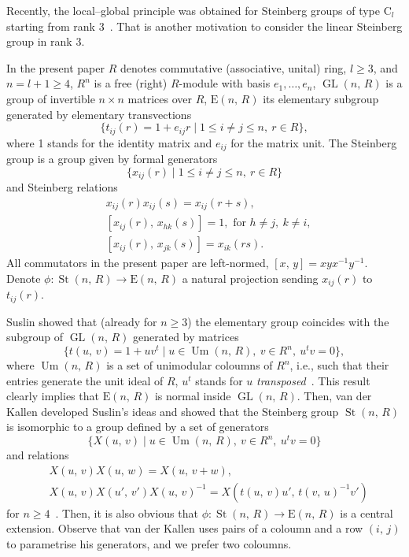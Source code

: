 \documentclass[11pt]{amsart}
\theoremstyle{plain} \declaretheorem[name=Theorem, Refname={Theorem,Theorems}]{tm} \Crefname{tm}{Theorem}{Theorems}
\numberwithin{equation}{section}
\theoremstyle{definition} \newtheorem{df}[lm]{Definition} \Crefname{df}{Definition}{Definitions}
\theoremstyle{remark} \newtheorem{rk}[lm]{Remark} \Crefname{rk}{Remark}{Remarks}
\newcommand{\E}{{\mathrm{E}}}
\newcommand{\Um}{\mathop{\mathrm{Um}}\nolimits}
\newcommand{\St}{\mathop{\mathrm{St}}\nolimits}
\newcommand{\GL}{\mathop{\mathrm{GL}}\nolimits}
\newcommand{\inv}{^{-1}}
\begin{document}
Recently, the local--global principle was obtained for Steinberg groups of type $\mathrm C_l$ starting from rank 3~\cite{Lav2}. 
That is another motivation to consider the linear Steinberg group in rank 3.

In the present paper $R$ denotes commutative (associative, unital) ring, $l\geq3$, and $n=l+1\geq4$, $R^n$ is a free (right) $R$-module with basis $e_1,\ldots,e_n$, 
$\GL(n,\,R)$ is a group of invertible $n\times n$ matrices over $R$, $\E(n,\,R)$ its elementary subgroup generated by elementary transvections 
$$\{t_{ij}(r)=1+e_{ij}r\mid1\leq i\neq j\leq n,\ r\in R\},$$
where 1 stands for the identity matrix and $e_{ij}$ for the matrix unit. The Steinberg group is a group given by formal generators
$$\{x_{ij}(r)\mid1\leq i\neq j\leq n,\ r\in R\}$$
and Steinberg relations
\setcounter{equation}{0}
\renewcommand{\theequation}{S\arabic{equation}}
\begin{align}
&x_{ij}(r)x_{ij}(s)=x_{ij}(r+s),\\
&[x_{ij}(r),\,x_{hk}(s)]=1,\text{ for }h\neq j,\ k\neq i,\\
&[x_{ij}(r),\,x_{jk}(s)]=x_{ik}(rs).
\end{align}
All commutators in the present paper are left-normed, $[x,\,y]=xyx\inv y\inv$. 
Denote $\phi\colon\St(n,\,R)\rightarrow\E(n,\,R)$ a natural projection sending $x_{ij}(r)$ to $t_{ij}(r)$.

Suslin showed that (already for $n\geq3$) the elementary group coincides with the subgroup of $\GL(n,\,R)$ generated by matrices
$$\{t(u,\,v)=1+uv^t\mid u\in\Um(n,\,R),\ v\in R^n,\ u^tv=0\},$$
where $\Um(n,\,R)$ is a set of unimodular coloumns of $R^n$, i.e., such that their entries generate the unit ideal of $R$, $u^t$ stands for $u$ {\it transposed}~\cite{Sus}.
This result clearly implies that $\E(n,\,R)$ is normal inside $\GL(n,\,R)$.
Then, van der Kallen developed Suslin's ideas and showed that the Steinberg group $\St(n,\,R)$ is isomorphic to a group defined by a set of generators
$$\{X(u,\,v)\mid u\in\Um(n,\,R),\ v\in R^n,\ u^tv=0\}$$ and relations
\setcounter{equation}{0} \renewcommand{\theequation}{K\arabic{equation}}
\begin{align}
&X(u,\,v)X(u,\,w)=X(u,\,v+w),\\
&X(u,\,v)X(u',\,v')X(u,\,v)\inv=X(t(u,\,v)u',\,t(v,\,u)\inv v')
\end{align}
for $n\geq4$~\cite{vdK}.
Then, it is also obvious that $\phi\colon\St(n,\,R)\rightarrow\E(n,\,R)$ is a central extension.
Observe that van der Kallen uses pairs of a coloumn and a row $(i,\,j)$ to parametrise his generators, and we prefer two coloumns.
\end{document}
